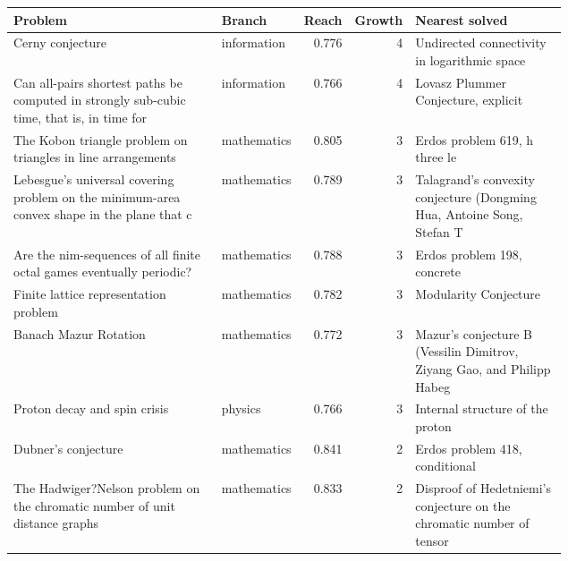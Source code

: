 \begin{tabular}{@{}p{0.42\linewidth}lrrp{0.3\linewidth}@{}}
\toprule
Problem & Branch & Reach & Growth & Nearest solved \\
\midrule
Cerny conjecture & information & 0.776 & 4 & Undirected connectivity in logarithmic space \\
Can all-pairs shortest paths be computed in strongly sub-cubic time, that is, in time for  & information & 0.766 & 4 & Lovasz Plummer Conjecture, explicit \\
The Kobon triangle problem on triangles in line arrangements & mathematics & 0.805 & 3 & Erdos problem 619, h three le \\
Lebesgue's universal covering problem on the minimum-area convex shape in the plane that c & mathematics & 0.789 & 3 & Talagrand's convexity conjecture (Dongming Hua, Antoine Song, Stefan T \\
Are the nim-sequences of all finite octal games eventually periodic? & mathematics & 0.788 & 3 & Erdos problem 198, concrete \\
Finite lattice representation problem & mathematics & 0.782 & 3 & Modularity Conjecture \\
Banach Mazur Rotation & mathematics & 0.772 & 3 & Mazur's conjecture B (Vessilin Dimitrov, Ziyang Gao, and Philipp Habeg \\
Proton decay and spin crisis & physics & 0.766 & 3 & Internal structure of the proton \\
Dubner's conjecture & mathematics & 0.841 & 2 & Erdos problem 418, conditional \\
The Hadwiger?Nelson problem on the chromatic number of unit distance graphs & mathematics & 0.833 & 2 & Disproof of Hedetniemi's conjecture on the chromatic number of tensor  \\
\bottomrule
\end{tabular}
